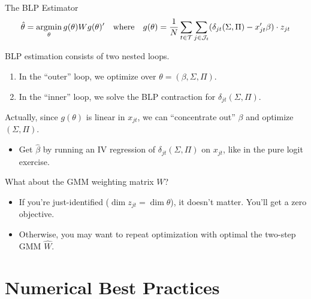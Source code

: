 \documentclass[aspectratio=169,t,11pt,table]{beamer}
\begin{document}
\begin{frame}{The BLP Estimator}
     \vspace{-\baselineskip}
    \begin{equation*}
        \hat{\theta} = \operatorname*{argmin}_\theta g(\theta) W g(\theta)' \quad\text{where}\quad g(\theta) = \frac{1}{N} \sum_{t \in \mathcal{T}} \sum_{j \in \mathcal{J}_t} (\delta_{jt}(\Sigma, \Pi) - x_{jt}'\beta) \cdot z_{jt}
    \end{equation*}
     \vspace{-0.5\baselineskip}
    \begin{wideitemize}
        \item BLP estimation consists of two nested loops.
        \begin{enumerate}
            \item In the ``outer'' loop, we optimize over $\theta = (\beta, \Sigma, \Pi)$.
            \item In the ``inner'' loop, we solve the BLP contraction for $\delta_{jt}(\Sigma, \Pi)$.
        \end{enumerate}
        \pause
        \item Actually, since $g(\theta)$ is linear in $x_{jt}$, we can ``concentrate out'' $\beta$ and optimize $(\Sigma, \Pi)$.
        \begin{itemize}
            \item Get $\hat{\beta}$ by running an IV regression of $\delta_{jt}(\Sigma, \Pi)$ on $x_{jt}$, like in the pure logit exercise.
        \end{itemize}
        \pause
        \item What about the GMM weighting matrix $W$?
        \begin{itemize}
            \item If you're just-identified ($\dim z_{jt} = \dim \theta$), it doesn't matter. You'll get a zero objective.
            \item Otherwise, you may want to repeat optimization with optimal the two-step GMM $\hat{W}$.
        \end{itemize}
    \end{wideitemize}
\end{frame}

\section{Numerical Best Practices}
\end{document}
